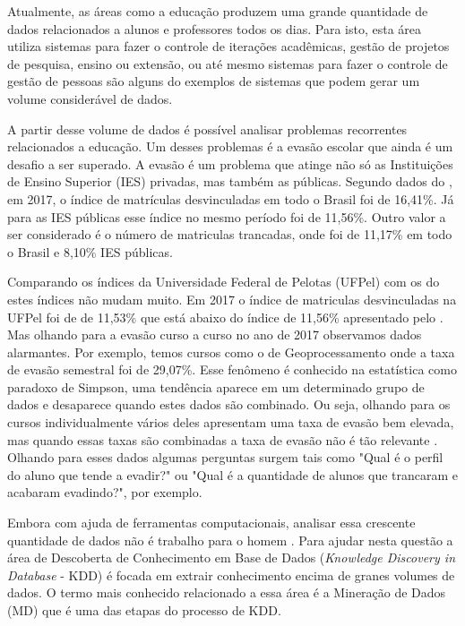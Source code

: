 \documentclass[diss,capa]{texufpel}
\begin{document}
    Atualmente, as áreas como a educação produzem uma grande quantidade de dados relacionados a alunos e professores todos os dias.
    Para isto, esta área utiliza sistemas para fazer o controle de iterações acadêmicas, gestão de projetos de pesquisa, ensino ou extensão, ou até mesmo sistemas para fazer o controle de gestão de pessoas são alguns do exemplos de sistemas que podem gerar um volume considerável de dados.

    A partir desse volume de dados é possível analisar problemas recorrentes relacionados a educação.
    Um desses problemas é a evasão escolar que ainda é um desafio a ser superado.
    A evasão é um problema que atinge não só as Instituições de Ensino Superior (IES) privadas, mas também as públicas.
    Segundo dados do \citet{inep:2018}, em 2017, o índice de matrículas desvinculadas em todo o Brasil foi de 16,41\%.
    Já para as IES públicas esse índice no mesmo período foi de 11,56\%.
    Outro valor a ser considerado é o número de matriculas trancadas, onde foi de 11,17\% em todo o Brasil e 8,10\% IES públicas.

    Comparando os índices da Universidade Federal de Pelotas (UFPel) com os do \citet{inep:2018} estes índices não mudam muito.
    Em 2017 o índice de matriculas desvinculadas na UFPel foi de de 11,53\% que está abaixo do índice de 11,56\% apresentado pelo \citet{inep:2018}.
    Mas olhando para a evasão curso a curso no ano de 2017 observamos dados alarmantes.
    Por exemplo, temos cursos como o de Geoprocessamento onde a taxa de evasão semestral foi de 29,07\%.
    Esse fenômeno é conhecido na estatística como paradoxo de Simpson, uma tendência aparece em um determinado grupo de dados e desaparece quando estes dados são combinado.
    Ou seja, olhando para os cursos individualmente vários deles apresentam uma taxa de evasão bem elevada, mas quando essas taxas são combinadas a taxa de evasão não é tão relevante \cite{wagner1982simpson}.
    Olhando para esses dados algumas perguntas surgem tais como "Qual é o perfil do aluno que tende a evadir?" ou "Qual é a quantidade de alunos que trancaram e acabaram evadindo?", por exemplo.

    Embora com ajuda de ferramentas computacionais, analisar essa crescente quantidade de dados não é trabalho para o homem \cite{goldschmidt2015data}.
    Para ajudar nesta questão a área de Descoberta de Conhecimento em Base de Dados (\textit{Knowledge Discovery in Database} - KDD) é focada em extrair conhecimento encima de granes volumes de dados.
    O termo mais conhecido relacionado a essa área é a Mineração de Dados (MD) que é uma das etapas do processo de KDD.
\end{document}
